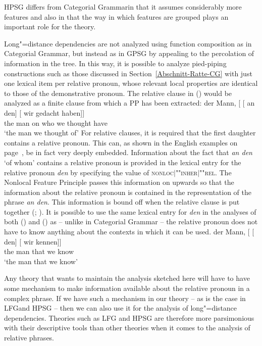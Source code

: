 HPSG differs from Categorial Grammar\indexcg in that it assumes considerably more features and also in that the way in which features are grouped plays
an important role for the theory.

Long"=distance dependencies are not analyzed using function composition as in Categorial Grammar, but instead
as in GPSG by appealing to the percolation of information in the tree. In this way, it is possible to analyze pied-piping constructions such as those
discussed in Section~\ref{Abschnitt-Ratte-CG} with just one lexical item per relative pronoun, whose relevant local properties are identical to those of the
demonstrative pronoun. The relative clause in () would be analyzed as a finite clause from which a PP has been extracted:
\ea
\gll der Mann, [ [ an den] [ wir gedacht haben]]\\
     the man   {}        {}        on who  {}          we  thought have\\
\glt `the man we thought of'
\z
For relative clauses, it is required that the first daughter contains a relative pronoun. This can, as shown in the English examples on page~\pageref{Beispiel-Minister},
be in fact very deeply embedded. Information about the fact that \emph{an den} `of whom' contains a relative pronoun is provided in the lexical entry for the relative
pronoun \emph{den} by specifying the value of \textsc{nonloc$|$""inher$|$""rel}.
The Nonlocal Feature Principle passes this information on upwards so that the information about the relative pronoun is contained in the representation
of the phrase \emph{an den}. This information is bound off when the relative clause is put together (\citealp[Chapter~5]{ps2}; \citealp{Sag97a}).
It is possible to use the same lexical entry for \emph{den} in the analyses of both () and
() as -- unlike in Categorial Grammar -- the relative pronoun does not have to know anything about the contexts in which it can be used.
\ea
\gll der Mann, [ [ den] [ wir kennen]]\\
	 the man {} {} that {} we know\\
\glt `the man that we know'
\z
\begin{sloppypar}
\noindent
Any theory that wants to maintain the analysis sketched here will have to have some mechanism to make information available about the relative pronoun
in a complex phrase. If we have such a mechanism in our theory -- as is the case in LFG\indexlfg and HPSG -- then we can also use it for the analysis
of long"=distance dependencies. Theories such as LFG and HPSG are therefore more parsimonious with their descriptive tools than other theories when it comes to
the analysis of relative phrases.
\end{sloppypar}

